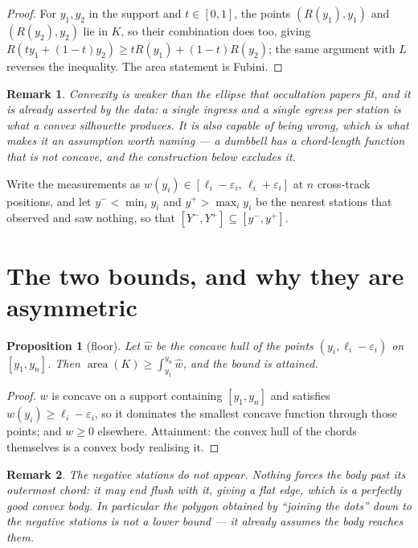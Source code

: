 \documentclass[11pt]{article}
\newtheorem{proposition}{Proposition}
\newtheorem*{remark}{Remark}
\begin{document}
\begin{proof}
For $y_1,y_2$ in the support and $t\in[0,1]$, the points $(R(y_1),y_1)$ and
$(R(y_2),y_2)$ lie in $K$, so their combination does too, giving
$R(ty_1+(1-t)y_2)\ge tR(y_1)+(1-t)R(y_2)$; the same argument with $L$ reverses
the inequality. The area statement is Fubini.
\end{proof}

\begin{remark}
Convexity is weaker than the ellipse that occultation papers fit, and it is
already asserted by the data: a single ingress and a single egress per station
is what a convex silhouette produces. It is also capable of being wrong, which
is what makes it an assumption worth naming --- a dumbbell has a chord-length
function that is not concave, and the construction below excludes it.
\end{remark}

Write the measurements as $w(y_i)\in[\ell_i-\varepsilon_i,\,\ell_i+\varepsilon_i]$
at $n$ cross-track positions, and let $y^-<\min_i y_i$ and $y^+>\max_i y_i$ be
the nearest stations that observed and saw nothing, so that
$[Y^-,Y^+]\subseteq[y^-,y^+]$.

\section{The two bounds, and why they are asymmetric}

\begin{proposition}[floor]\label{prop:floor}
Let $\widehat{w}$ be the concave hull of the points $(y_i,\ell_i-\varepsilon_i)$
on $[y_1,y_n]$. Then $\operatorname{area}(K)\ge\int_{y_1}^{y_n}\widehat{w}$, and
the bound is attained.
\end{proposition}

\begin{proof}
$w$ is concave on a support containing $[y_1,y_n]$ and satisfies
$w(y_i)\ge\ell_i-\varepsilon_i$, so it dominates the smallest concave function
through those points; and $w\ge0$ elsewhere. Attainment: the convex hull of the
chords themselves is a convex body realising it.
\end{proof}

\begin{remark}
The negative stations do not appear. Nothing forces the body past its outermost
chord: it may end flush with it, giving a flat edge, which is a perfectly good
convex body. In particular the polygon obtained by ``joining the dots'' down to
the negative stations is \emph{not} a lower bound --- it already assumes the
body reaches them.
\end{remark}
\end{document}
